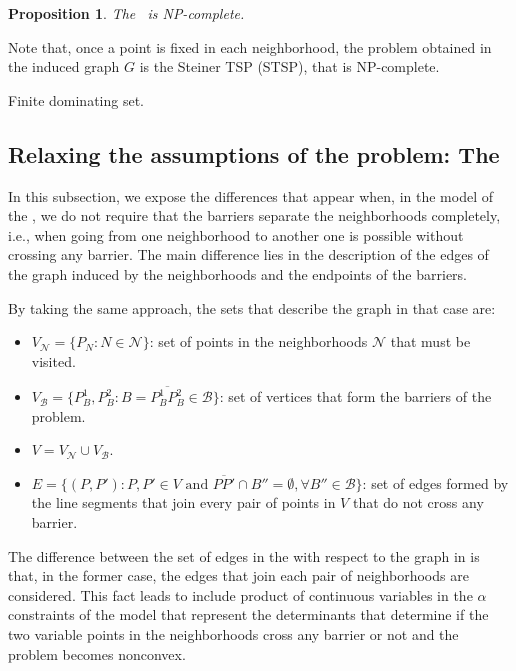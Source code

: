 \documentclass[a4paper]{elsarticle}
\newcommand{\TSPN}{{\sf{H-TSPN}\xspace }}
\newcommand{\TSPVN}{{\sf{H-TSPVN}\xspace }}
\newcommand{\B}{{\mathcal B}}
\newcommand{\VB}{{V^{}_{\mathcal B}}}
\newcommand{\VN}{{V^{}_{\mathcal N}}}
\newtheorem{prop}{Proposition}
\newcommand{\CV}[1]{{\color{atomictangerine}#1}}
\begin{document}
\CV{
\begin{prop}
The \TSPN \ is NP-complete.
\end{prop}

Note that, once a point is fixed in each neighborhood, the problem obtained in the induced graph $G$ is the Steiner TSP (STSP), that is NP-complete.

Finite dominating set.
}

\CV{
\subsection{Relaxing the assumptions of the problem: The \TSPVN}

In this subsection, we expose the differences that appear when, in the model of the \TSPN, we do not require that the barriers separate the neighborhoods completely, i.e., when going from one neighborhood to another one is possible without crossing any barrier. The main difference lies in the description of the edges of the graph induced by the neighborhoods and the endpoints of the barriers.

By taking the same approach, the sets that describe the graph in that case are:

\begin{itemize}
\item $\VN=\{P_N:N\in\mathcal N\}$: set of points in the neighborhoods $\mathcal N$ that must be visited.
\item $\VB=\{P^1_B, P^2_B:B=\overline{P^1_B P^2_B}\in \mathcal B\}$: set of vertices that form the barriers of the problem.
\item $V = \VN \cup \VB$.
\item $E=\{(P, P'):P, P' \in V \text{ and } \overline{PP'}\cap B''=\emptyset,\forall B''\in\B\}$: set of edges formed by the line segments that join every pair of points in $V$ that do not cross any barrier.
\end{itemize} 

The difference between the set of edges in the \TSPVN with respect to the graph in \TSPN is that, in the former case, the edges that join each pair of neighborhoods are considered. This fact leads to include product of continuous variables in the $\alpha$ constraints of the model that represent the determinants that determine if the two variable points in the neighborhoods cross any barrier or not and the problem becomes nonconvex.

}
\end{document}
